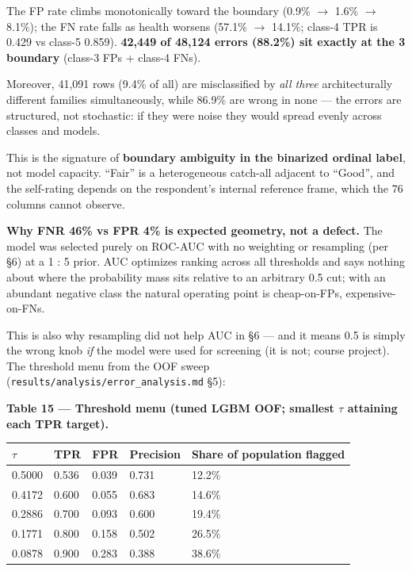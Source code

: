 \documentclass[11pt,a4paper]{article}
\begin{document}
The FP rate climbs monotonically toward the boundary (0.9\% $\rightarrow$ 1.6\% $\rightarrow$
8.1\%); the FN rate falls as health worsens (57.1\% $\rightarrow$ 14.1\%; class-4
TPR is 0.429 vs class-5 0.859). \textbf{42,449 of 48,124 errors (88.2\%)
sit exactly at the 3 boundary} (class-3 FPs + class-4 FNs).

Moreover, 41,091 rows (9.4\% of all) are misclassified by \emph{all
three} architecturally different families simultaneously, while 86.9\%
are wrong in none --- the errors are structured, not stochastic: if they
were noise they would spread evenly across classes and models.

This is the signature of \textbf{boundary ambiguity in the binarized
ordinal label}, not model capacity. ``Fair'' is a heterogeneous
catch-all adjacent to ``Good'', and the self-rating depends on the
respondent's internal reference frame, which the 76 columns cannot
observe.

\textbf{Why FNR 46\% vs FPR 4\% is expected geometry, not a defect.} The
model was selected purely on ROC-AUC with no weighting or resampling
(per \S{}6) at a 1 : 5 prior. AUC optimizes ranking across all thresholds
and says nothing about where the probability mass sits relative to an
arbitrary 0.5 cut; with an abundant negative class the natural operating
point is cheap-on-FPs, expensive-on-FNs.

This is also why resampling did not help AUC in \S{}6 --- and it means 0.5
is simply the wrong knob \emph{if} the model were used for screening (it
is not; course project). The threshold menu from the OOF sweep
(\texttt{results/analysis/error\_analysis.md} \S{}5):

\textbf{Table 15 --- Threshold menu (tuned LGBM OOF; smallest $\tau$
attaining each TPR target).}

{\def\LTcaptype{none} %

\begin{center}\small
\begin{tabular}{@{}lllll@{}}
\toprule\noalign{}
$\tau$ & TPR & FPR & Precision & Share of population flagged \\
\midrule\noalign{}
0.5000 & 0.536 & 0.039 & 0.731 & 12.2\% \\
0.4172 & 0.600 & 0.055 & 0.683 & 14.6\% \\
0.2886 & 0.700 & 0.093 & 0.600 & 19.4\% \\
0.1771 & 0.800 & 0.158 & 0.502 & 26.5\% \\
0.0878 & 0.900 & 0.283 & 0.388 & 38.6\% \\
\bottomrule
\end{tabular}
\end{center}

}
\end{document}

